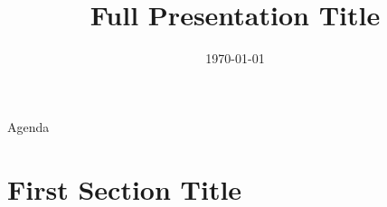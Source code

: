 \documentclass[aspectratio=169,10pt,t,xcolor=table]{beamer}
\title[Short Title]{Full Presentation Title}
\subtitle{}
\author{}
\institute{}
\date{\today}
\begin{document}
\begin{frame}[plain,c]
  \titlepage
\end{frame}

\begin{frame}{Agenda}
  \tableofcontents[subsectionstyle=hide]
\end{frame}

\section{First Section Title}
\end{document}
